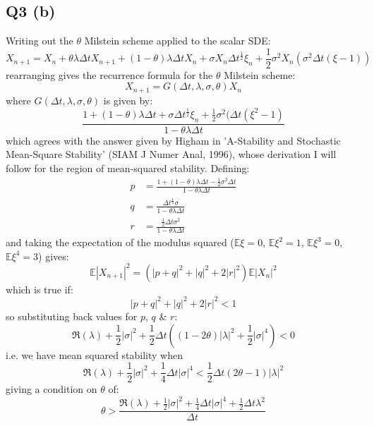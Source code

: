 \documentclass[11pt]{article} %
\begin{document}
\subsection{Q3 (b)}
Writing out the $\theta$ Milstein scheme applied to the scalar SDE:
\[
X_{n+1} = X_{n} + \theta\lambda\Delta t X_{n+1} + (1-\theta)\lambda\Delta t X_{n} + \sigma X_{n}\Delta t^{\frac{1}{2}}\xi_{n} + \frac{1}{2}\sigma^{2}X_{n}(\sigma^{2}\Delta t(\xi - 1))
\]
rearranging gives the recurrence formula for the $\theta$ Milstein scheme:
\[
	X_{n+1} = G(\Delta t,\lambda,\sigma,\theta)X_{n}
\]
where $G(\Delta t,\lambda,\sigma,\theta)$ is given by:
\[
	\frac{1 + (1-\theta)\lambda\Delta t + \sigma\Delta t^{\frac{1}{2}}\xi_{n} + \frac{1}{2}\sigma^{2}(\Delta t(\xi^{2} -1)}{1-\theta\lambda\Delta t}
\]
which agrees with the answer given by Higham in 'A-Stability and Stochastic Mean-Square Stability' (SIAM J Numer Anal, 1996), whose derivation I will follow for the region of mean-squared stability. Defining:
\begin{align}
	p &= \frac{1 + (1-\theta)\lambda\Delta t - \frac{1}{2}\sigma^{2}\Delta t}{1-\theta\lambda\Delta t}\\
	q &= \frac{\Delta t^{\frac{1}{2}}\sigma}{1-\theta\lambda\Delta t}\\
	r &= \frac{\frac{1}{2}\Delta t \sigma^{2}}{1-\theta\lambda\Delta t}
\end{align}
and taking the expectation of the modulus squared ($\mathbb{E}\xi = 0$, $\mathbb{E}\xi^{2} = 1$, $\mathbb{E}\xi^{3} = 0$, $\mathbb{E}\xi^{4} = 3$) gives:
\[
	\mathbb{E}|X_{n+1}|^{2} = (|p + q|^{2} + |q|^{2} + 2|r|^{2})\mathbb{E}|X_{n}|^{2}
\]
which is true if:
\[
	|p + q|^{2} + |q|^{2} + 2|r|^{2} < 1
\]
so substituting back values for $p$, $q$ \& $r$:
\[
	\Re(\lambda) + \frac{1}{2}|\sigma|^{2} + \frac{1}{2}\Delta t((1-2\theta) |\lambda|^{2} + \frac{1}{2}|\sigma|^{4}) < 0
\]
i.e. we have mean squared stability when
\[
	\Re(\lambda) + \frac{1}{2}|\sigma|^{2} + \frac{1}{4}\Delta t|\sigma|^{4} < \frac{1}{2}\Delta t(2\theta - 1)|\lambda|^{2}
\]
giving a condition on $\theta$ of:
\[
	\theta > \frac{\Re(\lambda) + \frac{1}{2}|\sigma|^{2} + \frac{1}{4}\Delta t|\sigma|^{4} + \frac{1}{2}\Delta t \lambda^{2}}{\Delta t}
\]
\end{document}
